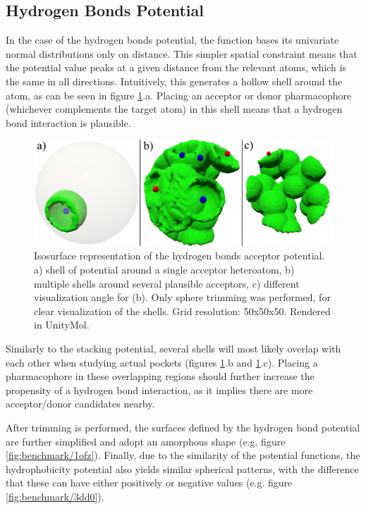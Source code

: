   \subsection{Hydrogen Bonds Potential}
    In the case of the hydrogen bonds potential, the function bases its univariate normal distributions only on distance. This simpler spatial constraint means that the potential value peaks at a given distance from the relevant atoms, which is the same in all directions. Intuitively, this generates a hollow shell around the atom, as can be seen in figure \ref{fig:results/visualize_hbonds}.a. Placing an acceptor or donor pharmacophore (whichever complements the target atom) in this shell means that a hydrogen bond interaction is plausible.

    \begin{figure}[H]
      \centering
      \includegraphics[width=1\textwidth]{figures/results/visualize_hbonds.png}
      \caption{\label{fig:results/visualize_hbonds} Isosurface representation of the hydrogen bonds acceptor potential. a) shell of potential around a single acceptor heteroatom, b) multiple shells around several plausible acceptors, c) different visualization angle for (b). Only sphere trimming was performed, for clear visualization of the shells. Grid resolution: 50x50x50. Rendered in UnityMol.}
    \end{figure}

    Similarly to the stacking potential, several shells will most likely overlap with each other when studying actual pockets (figures \ref{fig:results/visualize_hbonds}.b and \ref{fig:results/visualize_hbonds}.c). Placing a pharmacophore in these overlapping regions should further increase the propensity of a hydrogen bond interaction, as it implies there are more acceptor/donor candidates nearby.

    After trimming is performed, the surfaces defined by the hydrogen bond potential are further simplified and adopt an amorphous shape (e.g. figure \ref{fig:benchmark/1ofz}). Finally, due to the similarity of the potential functions, the hydrophobicity potential also yields similar spherical patterns, with the difference that these can have either positively or negative values (e.g. figure \ref{fig:benchmark/3dd0}).

